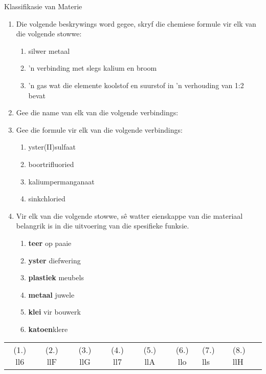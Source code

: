 \begin{eocexercises}{Klassifikasie van Materie}
{\begin{enumerate}[noitemsep, label=\textbf{\arabic*}. ]
\begin{enumerate}[noitemsep, label=\textbf{\alph*}. ]
\end{enumerate}
\item Die volgende beskrywings word gegee, skryf die chemiese formule vir elk van die volgende stowwe:
\begin{enumerate}[noitemsep, label=\textbf{\alph*}. ] 
\item silwer metaal
\item 'n verbinding met slegs kalium en broom
\item 'n gas wat die elemente koolstof en suurstof in 'n verhouding van 1:2 bevat
\end{enumerate}
\item Gee die name van elk van die volgende verbindings:
\begin{enumerate}[noitemsep, label=\textbf{\alph*}. ] 
\item $\text{NaBr}$
\item ${\text{Ba}(\text{NO}}}_{2})_2$
\item ${\text{SO}}_{2}$ 
\item $\text{H}_{2}\text{SO}_{4}$
\end{enumerate}
\item Gee die formule vir elk van die volgende verbindings:
\begin{enumerate}[noitemsep, label=\textbf{\alph*}.]
\item yster(II)sulfaat
\item boortrifluoried
\item kaliumpermanganaat
\item sinkchloried
\end{enumerate}

\item Vir elk van die volgende stowwe, sê watter eienskappe van die materiaal belangrik is in die uitvoering van die spesifieke funksie.
\begin{enumerate}[noitemsep, label=\textbf{\alph*}. ] 
\item \textbf{teer} op paaie
\item \textbf{yster} diefwering
\item \textbf{plastiek} meubels
\item \textbf{metaal} juwele
\item \textbf{klei} vir bouwerk
\item \textbf{katoen}klere
\end{enumerate}
\end{enumerate}

\practiceinfo
\begin{tabular}[h]{cccccc}
 (1.) ll6  &  (2.) llF  &  (3.) llG  &  (4.) ll7  &  (5.) llA  &  (6.) llo  &  (7.) lls  &  (8.) llH  & 
\end{tabular}
}
\end{eocexercises}
